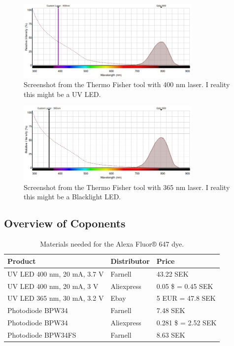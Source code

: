 \documentclass{article}
\begin{document}
\begin{figure}[H]
	\centering
	\includegraphics[width=0.8\textwidth]{./fig/spectrum_qdots_800_400}
	\caption{Screenshot from the Thermo Fisher tool with 400 nm laser. I reality this might be a UV LED.}
	\label{fig:qdots_800_400}
\end{figure}

\begin{figure}[H]
	\centering
	\includegraphics[width=0.8\textwidth]{./fig/spectrum_qdots_800_365}
	\caption{Screenshot from the Thermo Fisher tool with 365 nm laser. I reality this might be a Blacklight LED.}
	\label{fig:qdots_800_400}
\end{figure}

\subsection{Overview of Coponents}
\begin{table}[H]
\centering
\begin{tabular}{lll}
\hline
\textbf{Product}                               	& \textbf{Distributor} 	& \textbf{Price} \\\hline
UV LED 400 nm, 20 mA, 3.7 V			& Farnell		& 43.22 SEK	\\
UV LED 400 nm, 20 mA, 3 V			& Aliexpress		& 0.05 \$ = 0.45 SEK \\
UV LED 365 nm, 30 mA, 3.2 V			& Ebay			& 5 EUR = 47.8 SEK \\
Photodiode BPW34                              	& Farnell         	& 7.48 SEK       \\
Photodiode BPW34				& Aliexpress		& 0.281 \$ = 2.52 SEK \\
Photodiode BPW34FS				& Farnell		& 8.63 SEK \\\hline
\end{tabular}
\caption{Materials needed for the Alexa Fluor® 647 dye.}
\label{tab:647}
\end{table}
\end{document}
